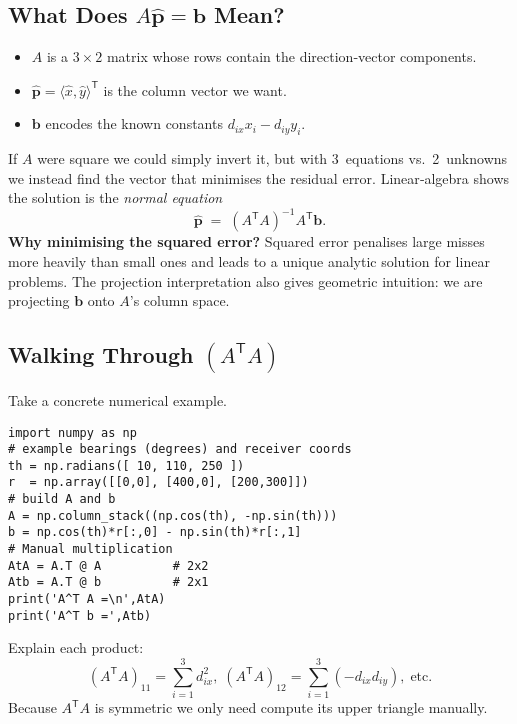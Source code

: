 \documentclass[11pt]{article}
\begin{document}
\subsection{What Does $A\hat{\mathbf p}=\mathbf b$ Mean?}
\begin{itemize}
  \item $A$ is a $3\times2$ matrix whose rows contain the direction‑vector components.
  \item $\hat{\mathbf p}=\langle \hat x,\hat y\rangle^{\mathsf T}$ is the column vector we want.
  \item $\mathbf b$ encodes the known constants $d_{ix}x_i-d_{iy}y_i$.
\end{itemize}
If $A$ were square we could simply invert it, but with 3 equations vs.~2 unknowns we instead find the vector that minimises the residual error.  Linear‑algebra shows the solution is the \emph{normal equation}
\begin{equation}
  \hat{\mathbf p}\;=\;(A^{\mathsf T}A)^{-1}A^{\mathsf T}\mathbf b.
  \label{eq:LS}
\end{equation}
\noindent\textbf{Why minimising the squared error?}  Squared error penalises large misses more heavily than small ones and leads to a unique analytic solution for linear problems.  The projection interpretation also gives geometric intuition: we are projecting $\mathbf b$ onto $A$’s column space.

\subsection{Walking Through $(A^{\mathsf T}A)$}
Take a concrete numerical example.
\begin{verbatim}
import numpy as np
# example bearings (degrees) and receiver coords
th = np.radians([ 10, 110, 250 ])
r  = np.array([[0,0], [400,0], [200,300]])
# build A and b
A = np.column_stack((np.cos(th), -np.sin(th)))
b = np.cos(th)*r[:,0] - np.sin(th)*r[:,1]
# Manual multiplication
AtA = A.T @ A          # 2x2
Atb = A.T @ b          # 2x1
print('A^T A =\n',AtA)
print('A^T b =',Atb)
\end{verbatim}
Explain each product:
\[
  (A^{\mathsf T}A)_{11}=\sum_{i=1}^3 d_{ix}^2,\; (A^{\mathsf T}A)_{12}=\sum_{i=1}^3 (-d_{ix}d_{iy}),\;\text{etc.}
\]
Because $A^{\mathsf T}A$ is symmetric we only need compute its upper triangle manually.

\end{document}

